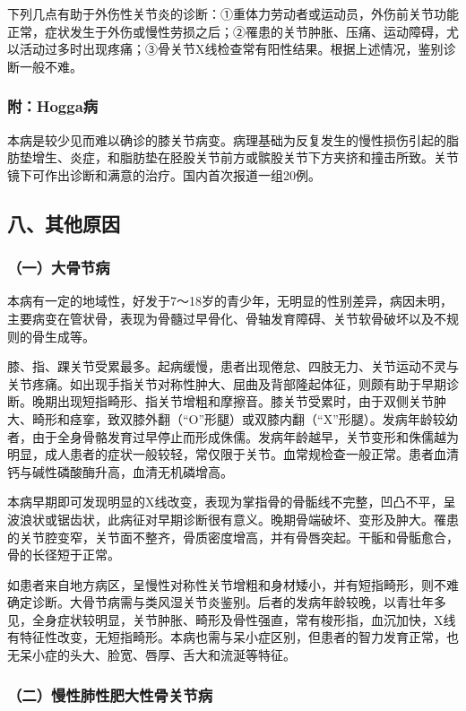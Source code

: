 下列几点有助于外伤性关节炎的诊断：①重体力劳动者或运动员，外伤前关节功能正常，症状发生于外伤或慢性劳损之后；②罹患的关节肿胀、压痛、运动障碍，尤以活动过多时出现疼痛；③骨关节X线检查常有阳性结果。根据上述情况，鉴别诊断一般不难。

\subsubsection{附：Hogga病}

本病是较少见而难以确诊的膝关节病变。病理基础为反复发生的慢性损伤引起的脂肪垫增生、炎症，和脂肪垫在胫股关节前方或髌股关节下方夹挤和撞击所致。关节镜下可作出诊断和满意的治疗。国内首次报道一组20例。

\subsection{八、其他原因}

\subsubsection{（一）大骨节病}

本病有一定的地域性，好发于7～18岁的青少年，无明显的性别差异，病因未明，主要病变在管状骨，表现为骨髓过早骨化、骨轴发育障碍、关节软骨破坏以及不规则的骨生成等。

膝、指、踝关节受累最多。起病缓慢，患者出现倦怠、四肢无力、关节运动不灵与关节疼痛。如出现手指关节对称性肿大、屈曲及背部隆起体征，则颇有助于早期诊断。晚期出现短指畸形、指关节增粗和摩擦音。膝关节受累时，由于双侧关节肿大、畸形和痉挛，致双膝外翻（“O”形腿）或双膝内翻（“X”形腿）。发病年龄较幼者，由于全身骨骼发育过早停止而形成侏儒。发病年龄越早，关节变形和侏儒越为明显，成人患者的症状一般较轻，常仅限于关节。血常规检查一般正常。患者血清钙与碱性磷酸酶升高，血清无机磷增高。

本病早期即可发现明显的X线改变，表现为掌指骨的骨骺线不完整，凹凸不平，呈波浪状或锯齿状，此病征对早期诊断很有意义。晚期骨端破坏、变形及肿大。罹患的关节腔变窄，关节面不整齐，骨质密度增高，并有骨唇突起。干骺和骨骺愈合，骨的长径短于正常。

如患者来自地方病区，呈慢性对称性关节增粗和身材矮小，并有短指畸形，则不难确定诊断。大骨节病需与类风湿关节炎鉴别。后者的发病年龄较晚，以青壮年多见，全身症状较明显，关节肿胀、畸形及骨性强直，常有梭形指，血沉加快，X线有特征性改变，无短指畸形。本病也需与呆小症区别，但患者的智力发育正常，也无呆小症的头大、脸宽、唇厚、舌大和流涎等特征。

\subsubsection{（二）慢性肺性肥大性骨关节病}


